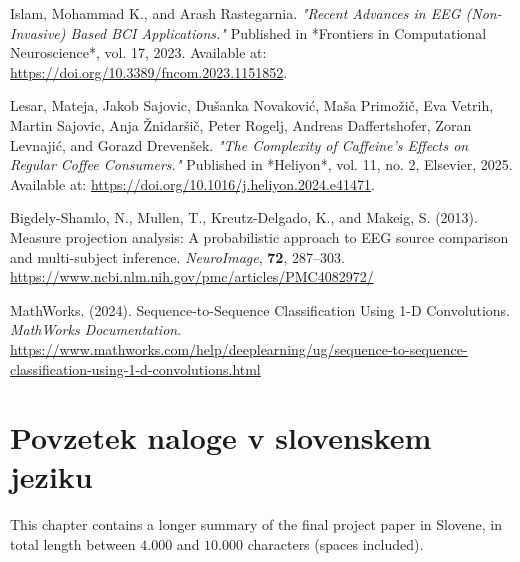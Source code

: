 \documentclass[12pt,a4paper,titlepage,openany]{report}
\begin{document}
\begin{thebibliography}{99}
     Islam, Mohammad K., and Arash Rastegarnia. 
     \emph{"Recent Advances in EEG (Non-Invasive) Based BCI Applications."} 
     Published in *Frontiers in Computational Neuroscience*, vol. 17, 2023. Available at: \url{https://doi.org/10.3389/fncom.2023.1151852}.

     Lesar, Mateja, Jakob Sajovic, Dušanka Novaković, Maša Primožič, Eva Vetrih, Martin Sajovic, Anja Žnidaršič, Peter Rogelj, Andreas Daffertshofer, Zoran Levnajić, and Gorazd Drevenšek.  
     \emph{"The Complexity of Caffeine's Effects on Regular Coffee Consumers."}  
     Published in *Heliyon*, vol. 11, no. 2, Elsevier, 2025. Available at: \url{https://doi.org/10.1016/j.heliyon.2024.e41471}.

    Bigdely-Shamlo, N., Mullen, T., Kreutz-Delgado, K., and Makeig, S. (2013).
    Measure projection analysis: A probabilistic approach to EEG source comparison and multi-subject inference.
    \textit{NeuroImage}, \textbf{72}, 287--303.
    \url{https://www.ncbi.nlm.nih.gov/pmc/articles/PMC4082972/}

    MathWorks. (2024).
    Sequence-to-Sequence Classification Using 1-D Convolutions.
    \textit{MathWorks Documentation}.
    \url{https://www.mathworks.com/help/deeplearning/ug/sequence-to-sequence-classification-using-1-d-convolutions.html}

    
     
\end{thebibliography}
\newpage


\chapter{Povzetek naloge v slovenskem jeziku}
\thispagestyle{fancy}

This chapter contains a longer summary of the final project paper in Slovene,
in total length between $4.000$ and $10.000$ characters (spaces included).


\end{document}
